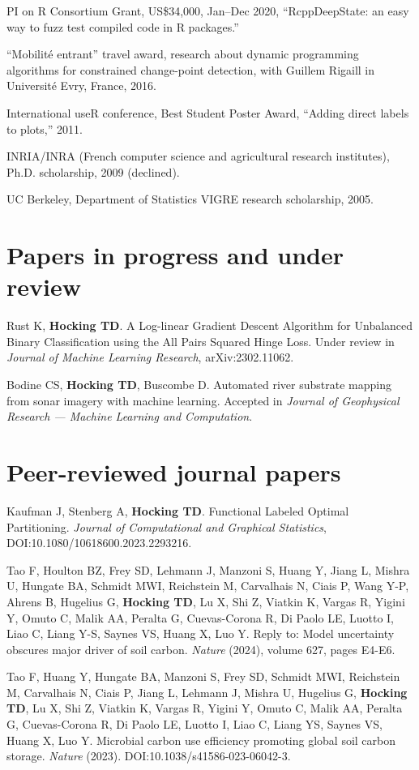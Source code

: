 \documentclass[margin,line]{res}
\begin{document}
\begin{resume}
PI on R Consortium Grant, US\$34,000, Jan--Dec 2020, ``RcppDeepState: an easy
way to fuzz test compiled code in R packages.''

``Mobilit\'e entrant'' travel award, research about dynamic
programming algorithms for constrained change-point detection, with
Guillem Rigaill in Universit\'e Evry, France, 2016.

International useR conference, Best Student Poster Award, ``Adding
direct labels to plots,'' 2011.

INRIA/INRA (French computer science and agricultural research institutes), Ph.D. scholarship, 2009 (declined).

UC Berkeley, Department of Statistics VIGRE research scholarship, 2005.

\section{\sc Papers in progress and under review}

Rust K, {\bf Hocking TD}. A Log-linear Gradient Descent Algorithm for
Unbalanced Binary Classification using the All Pairs Squared Hinge
Loss. Under review in {\it Journal of Machine Learning Research},
arXiv:2302.11062.

Bodine CS, {\bf Hocking TD}, Buscombe D. Automated river substrate
mapping from sonar imagery with machine learning. Accepted in {\it
  Journal of Geophysical Research --- Machine Learning and
  Computation}.

\section{\sc Peer-reviewed journal papers}

Kaufman J, Stenberg A, {\bf Hocking TD}. Functional Labeled Optimal
Partitioning. {\it Journal of Computational and Graphical Statistics},
DOI:10.1080/10618600.2023.2293216.

Tao F, Houlton BZ, Frey SD, Lehmann J, Manzoni S, Huang Y, Jiang L,
Mishra U, Hungate BA, Schmidt MWI, Reichstein M, Carvalhais N, Ciais
P, Wang Y-P, Ahrens B, Hugelius G, {\bf Hocking TD}, Lu X, Shi Z, Viatkin K,
Vargas R, Yigini Y, Omuto C, Malik AA, Peralta G, Cuevas-Corona R, Di
Paolo LE, Luotto I, Liao C, Liang Y-S, Saynes VS, Huang X, Luo
Y. Reply to: Model uncertainty obscures major driver of soil
carbon. {\it Nature} (2024), volume 627, pages E4-E6.

Tao F, Huang Y, Hungate BA, Manzoni S, Frey SD, Schmidt MWI,
Reichstein M, Carvalhais N, Ciais P, Jiang L, Lehmann J, Mishra U,
Hugelius G, {\bf Hocking TD}, Lu X, Shi Z, Viatkin K, Vargas R, Yigini
Y, Omuto C, Malik AA, Peralta G, Cuevas-Corona R, Di Paolo LE, Luotto
I, Liao C, Liang YS, Saynes VS, Huang X, Luo Y. Microbial carbon use
efficiency promoting global soil carbon storage. {\it Nature} (2023).
DOI:10.1038/s41586-023-06042-3.


\end{resume}
\end{document}
